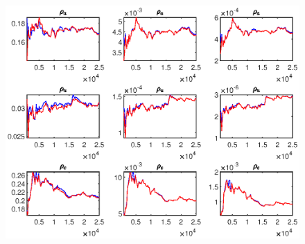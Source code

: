 \documentclass[11pt,preprint, authoryear]{elsarticle}
\let\origfigure\figure
\let\endorigfigure\endfigure
\renewenvironment{figure}[1][2] {
    \expandafter\origfigure\expandafter[H]
} {
    \endorigfigure
}
\numberwithin{equation}{section}
\numberwithin{figure}{section}
\numberwithin{table}{section}
\begin{document}
\begin{figure}
\begin{subfigure}[H]{0.49\textwidth}
         \includegraphics[width=\textwidth]{code/MCMC_5_money}
     \end{subfigure}
        \caption{MCMC univariate diagnostics of structural parameters for extended sample under the flexible money growth rule (\ref{s2}) [@brooks1998]. For each parameter, the first column shows the convergence diagnostics for the 80 per cent interval. The second and third columns shows the estimates of the second and third central moments (m2 and m3), respectively. The red line shows the 80 per cent quantile range based on the pooled draws from all sequences and the blue line shows the mean interval range based on 25 000 the draws of the individual sequences.}
        \label{mcmcu3}
\end{figure}


\end{document}
